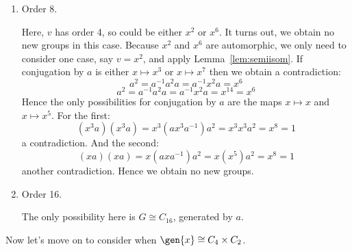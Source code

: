 \begin{enumerate}
    \item Order 8.

        Here, \(v\) has order 4, so could be either \(x^2\) or \(x^6\).
        It turns out, we obtain no new groups in this case.
        Because \(x^2\) and \(x^6\) are automorphic, we only need to consider one case, say \(v = x^2\), and apply
        Lemma~\ref{lem:semiisom}.
        If conjugation by \(a\) is either \(x\mapsto x^3\) or \(x\mapsto x^7\) then we obtain a contradiction:
        \[a^2 = a^{-1}a^2 a = a^{-1}x^2 a = x^6\]
        \[a^2 = a^{-1}a^2 a = a^{-1}x^2 a = x^{14} = x^6\]
        Hence the only possibilities for conjugation by \(a\) are the maps \(x\mapsto x\) and \(x \mapsto x^5\).
        For the first:
        \[(x^3 a)(x^3 a) = x^3(ax^3 a^{-1})a^2 = x^3 x^3 a^2 = x^8 = 1\]
        a contradiction.
        And the second:
        \[(xa)(xa) = x(axa^{-1})a^2 = x(x^5)a^2 = x^8 = 1\]
        another contradiction.
        Hence we obtain no new groups.

    \item Order 16.

        The only possibility here is \(G \cong C_{16}\), generated by \(a\).
\end{enumerate}

Now let's move on to consider when \(\gen{x} \cong C_4 \times C_2\).
